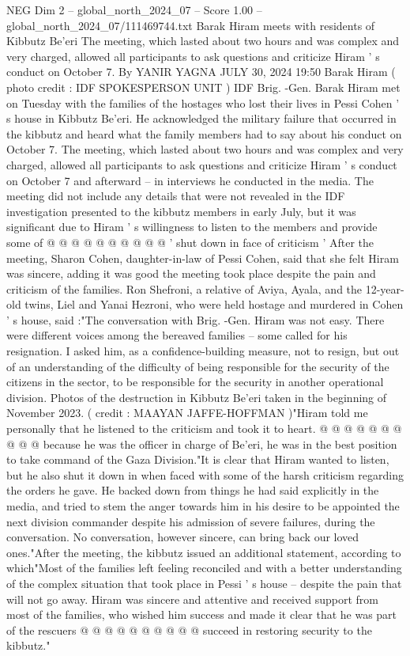 \begin{textsample}{NEG Dim 2 – global\_north\_2024\_07 – Score 1.00 – global\_north\_2024\_07/111469744.txt}  \label{ex:f2_neg_065}
Barak Hiram meets with residents of Kibbutz Be'eri The meeting, which lasted about two hours and was complex and very charged, allowed all participants to ask questions and criticize Hiram ' s conduct on October 7.
By YANIR YAGNA JULY 30, 2024 19:50 Barak Hiram ( photo credit : IDF SPOKESPERSON UNIT ) IDF Brig. -Gen.
Barak Hiram met on Tuesday with the families of the hostages who lost their lives in Pessi Cohen ' s house in Kibbutz Be'eri.
He acknowledged the military failure that occurred in the kibbutz and heard what the family members had to say about his conduct on October 7.
The meeting, which lasted about two hours and was complex and very charged, allowed all participants to ask questions and criticize Hiram ' s conduct on October 7 and afterward -- in interviews he conducted in the media.
The meeting did not include any details that were not revealed in the IDF investigation presented to the kibbutz members in early July, but it was significant due to Hiram ' s willingness to listen to the members and provide some of @ @ @ @ @ @ @ @ @ @ ' shut down in face of criticism ' After the meeting, Sharon Cohen, daughter-in-law of Pessi Cohen, said that she felt Hiram was sincere, adding it was good the meeting took place despite the pain and criticism of the families.
Ron Shefroni, a relative of Aviya, Ayala, and the 12-year-old twins, Liel and Yanai Hezroni, who were held hostage and murdered in Cohen ' s house, said :"The conversation with Brig. -Gen.
Hiram was not easy.
There were different voices among the bereaved families -- some called for his resignation.
I asked him, as a confidence-building measure, not to resign, but out of an understanding of the difficulty of being responsible for the security of the citizens in the sector, to be responsible for the security in another operational division.
Photos of the destruction in Kibbutz Be'eri taken in the beginning of November 2023. ( credit : MAAYAN JAFFE-HOFFMAN )"Hiram told me personally that he listened to the criticism and took it to heart. @ @ @ @ @ @ @ @ @ @ because he was the officer in charge of Be'eri, he was in the best position to take command of the Gaza Division."It is clear that Hiram wanted to listen, but he also shut it down in when faced with some of the harsh criticism regarding the orders he gave.
He backed down from things he had said explicitly in the media, and tried to stem the anger towards him in his desire to be appointed the next division commander despite his admission of severe failures, during the conversation.
No conversation, however sincere, can bring back our loved ones."After the meeting, the kibbutz issued an additional statement, according to which"Most of the families left feeling reconciled and with a better understanding of the complex situation that took place in Pessi ' s house -- despite the pain that will not go away.
Hiram was sincere and attentive and received support from most of the families, who wished him success and made it clear that he was part of the rescuers @ @ @ @ @ @ @ @ @ @ succeed in restoring security to the kibbutz."

\end{textsample}
